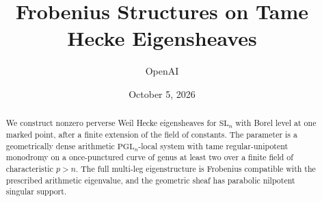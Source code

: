 \documentclass[11pt]{article}
\title{Frobenius Structures on Tame Hecke Eigensheaves}
\author{OpenAI}
\date{October 5, 2026}
\numberwithin{equation}{section}
\theoremstyle{definition}
\theoremstyle{remark}
\newcommand{\SL}{\mathrm{SL}}
\newcommand{\PGL}{\mathrm{PGL}}
\begin{document}
\maketitle
\begin{abstract}
We construct nonzero perverse Weil Hecke eigensheaves for $\SL_n$ with Borel
level at one marked point, after a finite extension of the field of constants.
The parameter is a geometrically dense arithmetic $\PGL_n$-local system with
tame regular-unipotent monodromy on a once-punctured curve of genus at least
two over a finite field of characteristic $p>n$. The full multi-leg
eigenstructure is Frobenius compatible with the prescribed arithmetic
eigenvalue, and the geometric sheaf has parabolic nilpotent singular support.
\end{abstract}
\begingroup
\small
\tableofcontents
\endgroup
\clearpage







\end{document}
